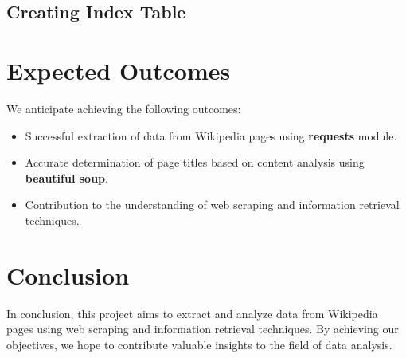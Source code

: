 \documentclass{article}
\begin{document}
\subsection{Creating Index Table}

\section{Expected Outcomes}
We anticipate achieving the following outcomes:
\begin{itemize}
    \item Successful extraction of data from Wikipedia pages using \textbf{requests} module.
    \item Accurate determination of page titles based on content analysis using \textbf{beautiful soup}.
    \item Contribution to the understanding of web scraping and information retrieval techniques.
\end{itemize}

\section{Conclusion}
In conclusion, this project aims to extract and analyze data from Wikipedia pages using web scraping and information retrieval techniques. By achieving our objectives, we hope to contribute valuable insights to the field of data analysis.

% 
% 
\end{document}
